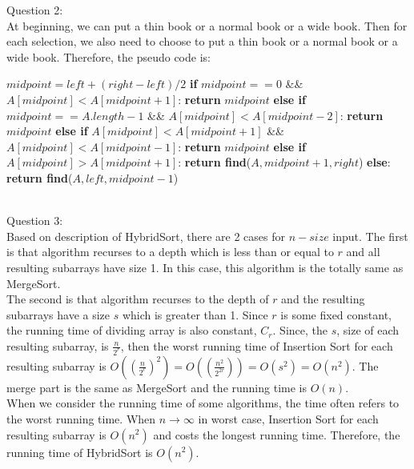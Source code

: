 \documentclass[12pt]{article}
\begin{document}
\pagebreak
\noindent
\large Question 2: \vspace{5mm} \\
\normalsize 
At beginning, we can put a thin book or a normal book or a wide book. Then for each selection, we also need to choose to put a thin book or a normal book or a wide book. Therefore, the pseudo code is: \\
\begin{algorithm}
\begin{algorithmic}
  \State \textbf{}$midpoint = left + (right - left) / 2$
  \State \textbf{if} $midpoint == 0$ \&\& $A[midpoint] < A[midpoint+1]$:
  \State \hspace{0.8cm}  \textbf{return} $midpoint$
  \State \textbf{else if} $midpoint == A.length-1$ \&\& $A[midpoint] < A[midpoint-2]$:
  \State \hspace{0.8cm}  \textbf{return} $midpoint$
  \State \textbf{else if} $A[midpoint] < A[midpoint + 1]$ \&\& $A[midpoint] < A[midpoint - 1]$:
  \State \hspace{0.8cm}  \textbf{return } $midpoint$
  \State \textbf{else if} $A[midpoint] > A[midpoint + 1]$:
  \State \hspace{0.8cm}  \textbf{return find}($A, midpoint + 1, right$)
  \State \textbf{else}:
  \State \hspace{0.8cm} \textbf{return find}($A, left, midpoint - 1$)
\EndFunction
\end{algorithmic}
\end{algorithm}\\



\pagebreak
\large Question 3: \vspace{5mm}\\
\normalsize 
Based on description of HybridSort, there are 2 cases for $n-size$ input. The first is that algorithm recurses to a depth which is less than or equal to $r$ and all resulting subarrays have size 1. In this case, this algorithm is the totally same as MergeSort. \vspace{2mm}\\
The second is that algorithm recurses to the depth of $r$ and the resulting subarrays have a size $s$ which is greater than 1. Since $r$ is some fixed constant, the running time of dividing array is also constant, $C_r$. Since, the $s$, size of each resulting subarray, is $\frac{n}{2^r} $,  then the worst running time of Insertion Sort for each resulting subarray is 
$O((\frac{n}{2^r})^2) = O((\frac{n^2}{2^{2r}})) = O(s^2) = O(n^2)$. The merge part is the same as MergeSort and the running time is $O(n)$. \vspace{2mm}\\
When we consider the running time of some algorithms, the time often refers to the worst running time. When $n\to\infty$ in worst case, Insertion Sort for each resulting subarray is $O(n^2)$ and costs the longest running time. Therefore, the running time of HybridSort is $O(n^2)$.
\end{document}
